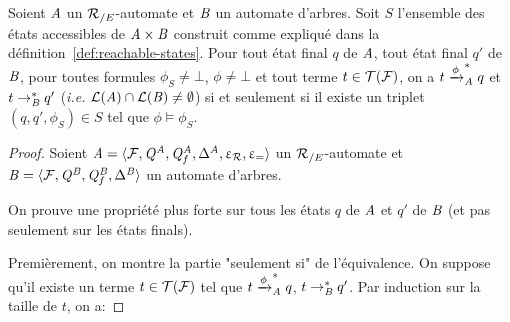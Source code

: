 \begin{lemma}
  Soient $\mathit A$ un ${\mathcal R_{/E}}$-automate et $\mathit B$ un automate d'arbres.
  Soit $S$ l'ensemble des états accessibles de $\mathit A\times \mathit B$ construit
  comme expliqué dans la définition~\ref{def:reachable-states}. 
  Pour tout état final $q$ de $\mathit A$, tout état final $q'$ de $\mathit B$, pour toutes formules $\phi_S\neq\bot$, $\phi\neq \bot$ et
  tout terme $t\in\mathcal{T(F)}$, on a $t\xrightarrow{\phi}^*_\mathit A q$ et $t \rightarrow_\mathit B^* q'$
  (\textit{i.e.} $\mathcal{L}(\mathit A)\cap \mathcal{L}(\mathit B) \neq \emptyset$) si et seulement si il existe un 
  triplet $(q,q',\phi_S)\in S$ tel que $\phi \models \phi_S$. 
\end{lemma}

\begin{proof}
  Soient $\mathit A =\langle \mathcal{F}, \mathit Q^\mathit A,\mathit Q^\mathit A_f,\Delta^\mathit A, \upvarepsilon_{\mathcal R}, \upvarepsilon_{=} \rangle$
  un ${\mathcal R_{/E}}$-automate et $\mathit B=\langle \mathcal{F}, \mathit Q^\mathit B,\mathit Q^\mathit B_f,\Delta^\mathit B \rangle$ un automate d'arbres.  


On prouve une propriété plus forte sur tous les états $q$ de $\mathit A$ et $q'$ de $\mathit B$ 
(et pas seulement sur les états finals).

Premièrement, on montre la partie "seulement si" de l'équivalence.
On suppose qu'il 
existe un terme $t\in\mathcal{T(F)}$ tel que $t\xrightarrow{\phi}^*_\mathit A q$, $t \rightarrow_\mathit B^* q'$.
Par induction sur la taille de $t$, on a:


\end{proof}
